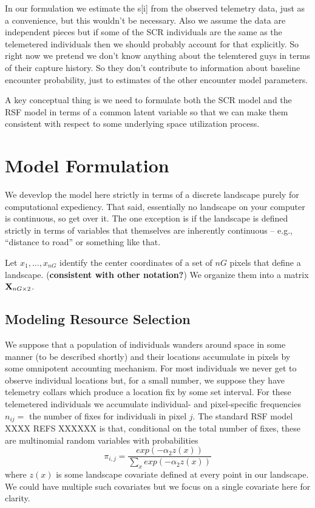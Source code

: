 In our formulation we estimate the s[i] from the observed telemetry
data, just as a convenience, but this wouldn't be necessary.
Also we assume the data are independent pieces but if some of the SCR
individuals are the same as the telemetered individuals then we should
probably account for that explicitly. So right now we pretend we don't
know anything about the telemtered guys in terms of their capture
history. So they don't contribute to information about baseline
encounter probability, just to estimates of the other encounter model
parameters. 

A key conceptual thing is we need to formulate both the SCR model and
the RSF model in terms of a common latent variable so that we can make
them consistent with respect to some underlying space utilization process.


\section{Model Formulation}

We devevlop the model here strictly in terms of a discrete
landscape purely for computational expediency. That said, 
essentially no landscape on your computer is continuous, so get over
it. The one exception is if the landscape is defined strictly in terms
of variables that themselves are inherently continuous -- e.g.,
``distance to road'' or something like that. 

Let  $x_{1},\ldots,x_{nG}$ identify the center coordinates of a set of
$nG$ pixels that define a landscape. ({\bf consistent with other
  notation?}) We organize them into a matrix ${\bf X}_{nG \times 2}$.

\subsection*{Modeling Resource Selection}

We suppose that a population of individuals wanders around space in
some manner (to be described shortly) and their locations accumulate
in pixels by some omnipotent accounting mechanism. For most
individuals we never get to observe individual locations but, for a
small number, we suppose they have telemetry collars which produce a
location fix by some set interval. For these telemetered individuals
we accumulate individual- and pixel-specific frequencies $n_{ij} = $
the number of fixes for individual$ $i in pixel $j$.  The standard RSF
model XXXX REFS XXXXXX is that, conditional on the total number of
fixes, these are multinomial random variables with probabilities
\[
 \pi_{i,j} = \frac{ exp( -\alpha_{2} z(x) ) }{ \sum_{x} exp(-\alpha_{2} z(x))} 
\]
where $z(x)$ is some landscape covariate defined at every point in our
landscape. We could have multiple such covariates but we focus on a
single covariate here for clarity. 

